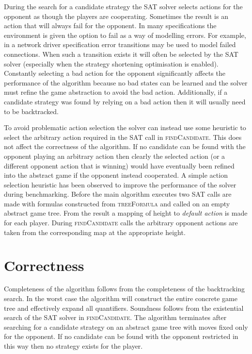 During the search for a candidate strategy the SAT solver selects actions for the opponent as though the players are cooperating. Sometimes the result is an action that will always fail for the opponent. In many specifications the environment is given the option to fail as a way of modelling errors. For example, in a network driver specification error transitions may be used to model failed connections. When such a transition exists it will often be selected by the SAT solver (especially when the strategy shortening optimisation is enabled). Constantly selecting a bad action for the opponent significantly affects the performance of the algorithm because no bad states can be learned and the solver must refine the game abstraction to avoid the bad action. Additionally, if a candidate strategy was found by relying on a bad action then it will usually need to be backtracked. 

To avoid problematic action selection the solver can instead use some heuristic to select the arbitrary action required in the SAT call in \textsc{findCandidate}. This does not affect the correctness of the algorithm. If no candidate can be found with the opponent playing an arbitrary action then clearly the selected action (or a different opponent action that is winning) would have eventually been refined into the abstract game if the opponent instead cooperated. A simple action selection heuristic has been observed to improve the performance of the solver during benchmarking. Before the main algorithm executes two SAT calls are made with formulas constructed from \textsc{treeFormula} and \textsc{} called on an empty abstract game tree. From the result a mapping of height to \emph{default action} is made for each player. During \textsc{findCandidate} calls the arbitrary opponent actions are taken from the corresponding map at the appropriate height.

\section{Correctness}

Completeness of the algorithm follows from the completeness of the backtracking search. In the worst case the algorithm will construct the entire concrete game tree and effectively expand all quantifiers. Soundness follows from the existential search of the SAT solver in \textsc{findCandidate}. The algorithm terminates after searching for a candidate strategy on an abstract game tree with moves fixed only for the opponent. If no candidate can be found with the opponent restricted in this way then no strategy exists for the player.

